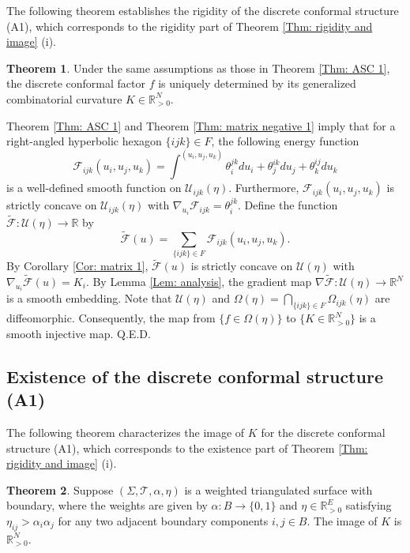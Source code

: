 \documentclass[12pt]{amsart}
\theoremstyle{definition}
\newtheorem{theorem}{Theorem}[section]
\def\qed{\hfill{Q.E.D.}\smallskip}
\begin{document}
The following theorem establishes the rigidity of the discrete conformal structure (A1), 
which corresponds to the rigidity part of Theorem \ref{Thm: rigidity and image} (i).

\begin{theorem}\label{Thm: rigidity 1}
Under the same assumptions as those in Theorem \ref{Thm: ASC 1},
the discrete conformal factor $f$ is uniquely determined by its generalized combinatorial curvature $K\in\mathbb{R}^N_{>0}$.
\end{theorem}
\proof
Theorem \ref{Thm: ASC 1} and Theorem \ref{Thm: matrix negative 1} imply that for a right-angled hyperbolic  hexagon $\{ijk\}\in F$,
the following energy function
\begin{equation*}
\mathcal{F}_{ijk}(u_i,u_j,u_k)=\int^{(u_i,u_j,u_k)}
\theta^{jk}_idu_i+\theta^{ik}_jdu_j+\theta^{ij}_kdu_k
\end{equation*}
is a well-defined smooth function on $\mathcal{U}_{ijk}(\eta)$.
Furthermore, $\mathcal{F}_{ijk}(u_i,u_j,u_k)$ is strictly concave on $\mathcal{U}_{ijk}(\eta)$ with $\nabla_{u_i}\mathcal{F}_{ijk}=\theta^{jk}_i$.
Define the function $\widetilde{\mathcal{F}}:\mathcal{U}(\eta)\rightarrow \mathbb{R}$ by
\begin{equation*}
\widetilde{\mathcal{F}}(u)=\sum_{\{ijk\}\in F}\mathcal{F}_{ijk}(u_i,u_j,u_k).
\end{equation*}
By Corollary \ref{Cor: matrix 1},
$\widetilde{\mathcal{F}}(u)$ is strictly concave on $\mathcal{U}(\eta)$ with $\nabla_{u_i}\widetilde{\mathcal{F}}(u)=K_i$.
By Lemma \ref{Lem: analysis}, the gradient map $\nabla \widetilde{\mathcal{F}}: \mathcal{U}(\eta)\rightarrow \mathbb{R}^N$ is a smooth embedding.
Note that $\mathcal{U}(\eta)$ and $\Omega(\eta)=\bigcap_{\{ijk\}\in F}\Omega_{ijk}(\eta)$ are diffeomorphic.
Consequently, the map from $\{f\in \Omega(\eta)\}$ to $\{K\in \mathbb{R}^N_{>0}\}$ is a smooth injective map.
\qed

\subsection{Existence of the discrete conformal structure (A1)}

The following theorem characterizes the image of $K$ for the discrete conformal structure (A1), 
which corresponds to the existence part of Theorem \ref{Thm: rigidity and image} (i).

\begin{theorem}\label{Thm: image 1}
Suppose $(\Sigma,\mathcal{T},\alpha,\eta)$ is a weighted triangulated surface with boundary, where the weights are given by $\alpha: B\rightarrow \{0,1\}$ and $\eta\in \mathbb{R}_{>0}^E$ satisfying $\eta_{ij}>\alpha_i\alpha_j$ for any two adjacent boundary components $i,j\in B$.
The image of $K$ is $\mathbb{R}^N_{>0}$.
\end{theorem}
\end{document}

